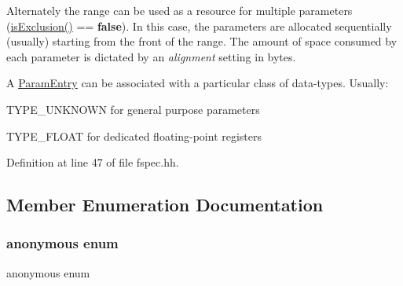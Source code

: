 Alternately the range can be used as a resource for multiple parameters (\mbox{\hyperlink{class_param_entry_a1c72a43ac9238f9fae35f38b88ef2010}{is\+Exclusion()}} == {\bfseries{false}}). In this case, the parameters are allocated sequentially (usually) starting from the front of the range. The amount of space consumed by each parameter is dictated by an {\itshape alignment} setting in bytes.

A \mbox{\hyperlink{class_param_entry}{Param\+Entry}} can be associated with a particular class of data-\/types. Usually\+:
\begin{DoxyItemize}
\item T\+Y\+P\+E\+\_\+\+U\+N\+K\+N\+O\+WN for general purpose parameters
\item T\+Y\+P\+E\+\_\+\+F\+L\+O\+AT for dedicated floating-\/point registers 
\end{DoxyItemize}

Definition at line 47 of file fspec.\+hh.



\subsection{Member Enumeration Documentation}
\mbox{\label{class_param_entry_ac2717c4cafbf14b70f326ae8bac627c3}} 
\subsubsection{\texorpdfstring{anonymous enum}{anonymous enum}}
{\footnotesize\ttfamily anonymous enum}

